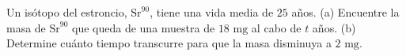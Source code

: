 \item Un isótopo del estroncio, $\text{Sr}^{90}$, tiene una vida media de $25$ años. (a) Encuentre la masa de $\text{Sr}^{90}$ que queda de una muestra de $18 \text{ mg}$ al cabo de $t$ años. (b) Determine cuánto tiempo transcurre para que la masa disminuya a $2 \text{ mg}$.
